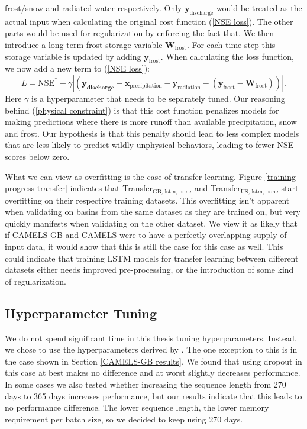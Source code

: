 frost/snow and radiated water respectively. Only $\bm{y}_\text{discharge}$ would 
be treated as the actual input when calculating the original cost function 
(\ref{NSE loss}). The other parts would be used for regularization by enforcing 
the fact that. We then introduce a long term frost storage variable $\bm{W}_\text{frost}$.
For each time step this storage variable is updated by adding $\bm{y}_\text{frost}$.
When calculating the loss function, we now add a new term to (\ref{NSE loss}):
\begin{equation}
    L = \text{NSE}^* + \gamma \left|(\bm{y_\text{discharge}} - \bm{x}_\text{precipitation} 
    - \bm{y}_\text{radiation} - (\bm{y}_\text{frost} - \bm{W}_\text{frost}))\right|
    \label{physical constraint}.
\end{equation}
Here $\gamma$ is a hyperparameter that needs to be separately tuned. Our reasoning 
behind (\ref{physical constraint}) is that this cost function penalizes models for 
making predictions where there is more runoff than available precipitation, 
snow and frost. Our hypothesis is that this penalty should lead to less complex 
models that are less likely to predict wildly unphysical behaviors, leading to 
fewer NSE scores below zero. 

 What we can view as overfitting is the case of transfer learning. Figure 
 \ref{training progress transfer} indicates that Transfer$_\text{GB, lstm, none}$ 
 and Transfer$_\text{US, lstm, none}$ start overfitting on their respective training 
 datasets. This overfitting isn't apparent when validating on basins from the 
 same dataset as they are trained on, but very quickly manifests when validating 
 on the other dataset. We view it as likely that if CAMELS-GB and CAMELS were to 
 have a perfectly overlapping supply of input data, it would show that this is 
 still the case for this case as well. This could indicate that training LSTM models 
 for transfer learning between different datasets either needs improved pre-processing, 
 or the introduction of some kind of regularization. 
\subsection{Hyperparameter Tuning}
We do not spend significant time in this thesis tuning hyperparameters. Instead, 
we chose to use the hyperparameters derived by \citet{lstm_second_paper}. The one 
exception to this is in the case shown in Section \ref{CAMELS-GB results}. We found 
that using dropout in this case at best makes no difference and at worst slightly 
decreases performance. In some cases we also tested whether increasing the 
sequence length from 270 days to 365 days increases performance, but our results 
indicate that this leads to no performance difference. The lower sequence length, 
the lower memory requirement per batch size, so we decided to keep using 270 days. 

